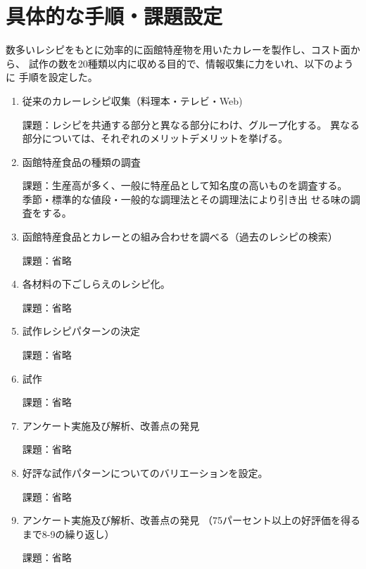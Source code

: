 \documentclass[openany,11pt,papersize]{jsbook}
\begin{document}


\section{具体的な手順・課題設定}\label{sec:tejun}

数多いレシピをもとに効率的に函館特産物を用いたカレーを製作し、コスト面から、 
試作の数を20種類以内に収める目的で、情報収集に力をいれ、以下のように 
手順を設定した。

\begin{enumerate}
\item 従来のカレーレシピ収集（料理本・テレビ・Web)
\par 課題：レシピを共通する部分と異なる部分にわけ、グループ化する。
     異なる部分については、それぞれのメリットデメリットを挙げる。　　

\item 函館特産食品の種類の調査
\par 課題：生産高が多く、一般に特産品として知名度の高いものを調査する。
           季節・標準的な値段・一般的な調理法とその調理法により引き出
           せる味の調査をする。　　
 　 
\item 函館特産食品とカレーとの組み合わせを調べる（過去のレシピの検索）
\par 課題：省略
 　　　 
\item 各材料の下ごしらえのレシピ化。
\par 課題：省略
 　　　 
\item 試作レシピパターンの決定
\par 課題：省略
 　　　 
\item 試作
\par 課題：省略
 　　　 
\item アンケート実施及び解析、改善点の発見
\par 課題：省略

\item 好評な試作パターンについてのバリエーションを設定。　　　
\par 課題：省略
 　　　 
\item アンケート実施及び解析、改善点の発見
（75パーセント以上の好評価を得るまで8-9の繰り返し）
\par 課題：省略
\end{enumerate}
\end{document}
